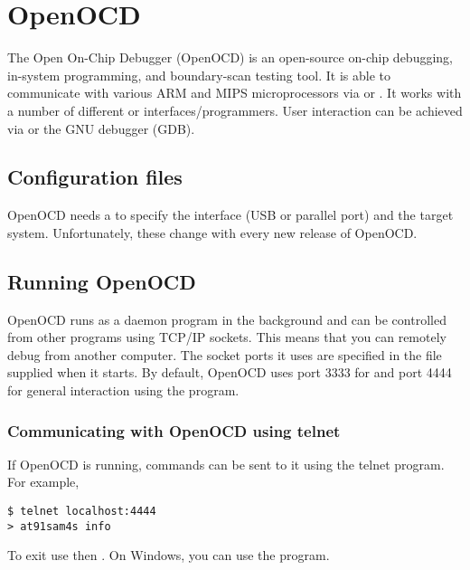 \chapter{OpenOCD}
\label{OpenOCD}

The Open On-Chip Debugger (OpenOCD) is an open-source on-chip
debugging, in-system programming, and boundary-scan testing tool. It
is able to communicate with various ARM and MIPS microprocessors via
 or . It works with a number of
different  or 
interfaces/programmers. User interaction can be achieved via
 or the GNU debugger (GDB).


\section{Configuration files}
\label{configuration-files}

OpenOCD needs a  to
specify the interface (USB or parallel port) and the target system.
Unfortunately, these change with every new release of OpenOCD.


\section{Running OpenOCD}
\label{running-openocd}

OpenOCD runs as a daemon program in the background and can be
controlled from other programs using TCP/IP sockets. This means that
you can remotely debug from another computer. The socket ports it uses
are specified in the  file supplied when it starts. By default, OpenOCD
uses port 3333 for  and port 4444 for general
interaction using the  program.


\subsection{Communicating with OpenOCD using telnet}
\label{communicating-with-openocd-using-telnet}

If OpenOCD is running, commands can be sent to it using the telnet
program.  For example,
%
\begin{verbatim}
$ telnet localhost:4444
> at91sam4s info
\end{verbatim}
%
To exit use \code{ctrl-]} then .  On Windows, you can use the
   program.


